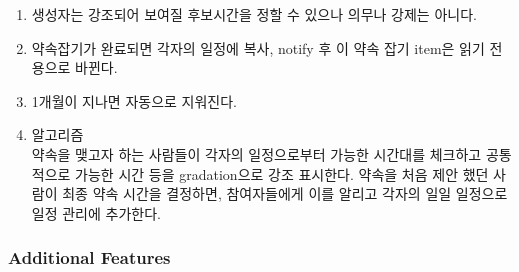 \documentclass[a4paper,titlepage]{article}
\begin{document}
\begin{enumerate}
\begin{enumerate}
		\item 생성자는 강조되어 보여질 후보시간을 정할 수 있으나 의무나 강제는 아니다.
		\item 약속잡기가 완료되면 각자의 일정에 복사, notify 후 이 약속 잡기 item은 읽기 전용으로 바뀐다. 
		\item 1개월이 지나면 자동으로 지워진다. 
		\item 알고리즘\\
		약속을 맺고자 하는 사람들이 각자의 일정으로부터 가능한 시간대를 체크하고 공통적으로 가능한 시간 등을 gradation으로 강조 표시한다.
		약속을 처음 제안 했던 사람이 최종 약속 시간을 결정하면, 참여자들에게 이를 알리고 각자의 일일 일정으로 일정 관리에 추가한다. 
	\end{enumerate}
\end{enumerate}
\subsubsection{Additional Features}
\end{document}
